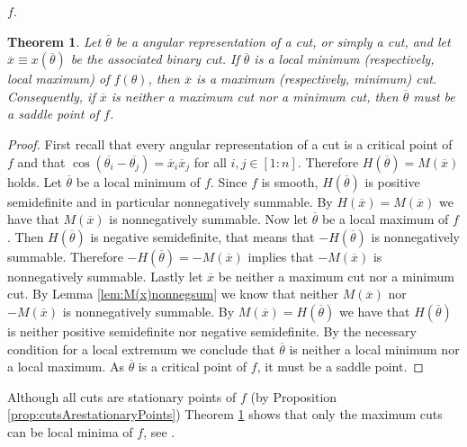 \documentclass[12pt,a4paper]{article}
\theoremstyle{mythm}
\newtheorem{thm}{Theorem}[section]
\begin{document}
$ f $.
\begin{thm}
\label{thm:classificationcuts} 
Let $ \overline{ \theta }  $ be a angular representation of a cut, or simply a cut, and let $ \overline{ x } \equiv x( \overline{ \theta } ) $ be the associated binary cut. If $ \overline{ \theta }  $ is a local minimum
(respectively, local maximum) of $ f (\theta) $, then $ \overline{ x }  $ is a maximum (respectively, minimum) cut. 
Consequently, if $ \overline{ x }  $ is neither a maximum cut nor a minimum cut, then $ \overline{ \theta }  $ must be a saddle point of $ f $.
\end{thm} 
\begin{proof}
First recall that every angular representation of a cut is a critical point of $ f $ and that 
$ \cos( \overline{ \theta_i } - \overline{ \theta_j }  ) = \overline{ x }_i \overline{ x }_j  $ for all $ i,j \in \left[ 1:n \right]  $.
Therefore $ H( \overline{ \theta } ) = M( \overline{ x } ) $ holds.
Let $ \overline{ \theta }  $ be a local minimum of $ f $.
Since $ f $ is smooth, $ H ( \overline{ \theta } ) $ is positive semidefinite and in particular nonnegatively summable. By $ H ( \overline{ x } ) = M ( \overline{ x } ) $ we have
that $ M ( \overline{ x } ) $ is nonnegatively summable.
Now let $ \overline{ \theta }  $ be a local maximum of $ f $. Then $ H ( \overline{ \theta } ) $ is negative semidefinite, that means that $ - H ( \overline{ \theta } ) $ is
nonnegatively summable. Therefore $ - H ( \overline{ \theta } ) = - M ( \overline{ x } ) $ implies that $ - M ( \overline{ x } ) $ is nonnegatively summable.
Lastly let $ \overline{ x }  $ be neither a maximum cut nor a minimum cut.
By Lemma \ref{lem:M(x)nonnegsum} we know that neither $ M ( \overline{ x } ) $ nor $ - M ( \overline{ x } ) $ is nonnegatively summable. 
By $ M ( \overline{  x } ) = H ( \overline{ \theta } ) $ we have that $ H ( \overline{ \theta } )  $ is neither positive semidefinite nor negative semidefinite. By the
necessary condition for a local extremum we conclude that $ \overline{ \theta }  $ is neither a local minimum nor a local maximum. As $ \overline{ \theta }  $ is a critical
point of $ f $, it must be a saddle point.
\end{proof}
Although all cuts are stationary points of $ f $ (by Proposition \ref{prop:cutsArestationaryPoints}) Theorem \ref{thm:classificationcuts} shows that only the maximum cuts can be local minima of $ f $, see \cite[p. 508]{Burer2002}.
\end{document}
